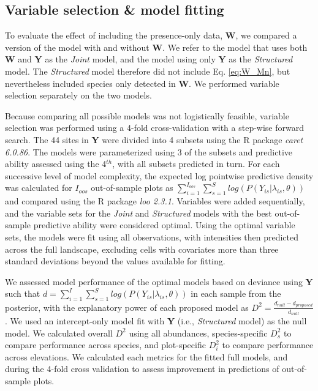 \documentclass[preprint,final,times,12pt,3p]{elsarticle}
\begin{document}
\subsection{Variable selection \& model fitting}
To evaluate the effect of including the presence-only data, \textbf{W}, we compared a version of the model with and without \textbf{W}. We refer to the model that uses both \textbf{W} and \textbf{Y} as the \emph{Joint} model, and the model using only \textbf{Y} as the \emph{Structured} model. The \emph{Structured} model therefore did not include Eq. \ref{eq:W_Mn}, but nevertheless included species only detected in \textbf{W}. We performed variable selection separately on the two models.

Because comparing all possible models was not logistically feasible, variable selection was performed using a 4-fold cross-validation with a step-wise forward search. The 44 sites in \textbf{Y} were divided into 4 subsets using the R package \emph{caret 6.0.86}. The models were parameterized using 3 of the subsets and predictive ability assessed using the 4$^{th}$, with all subsets predicted in turn. For each successive level of model complexity, the expected log pointwise predictive density was calculated for $I_{oos}$ out-of-sample plots as $\sum_{i=1}^{I_{oos}}\sum_{s=1}^S log(P(Y_{is} | \lambda_{is}, \theta))$ and compared using the R package \emph{loo 2.3.1}. Variables were added sequentially, and the variable sets for the \emph{Joint} and \emph{Structured} models with the best out-of-sample predictive ability were considered optimal. Using the optimal variable sets, the models were fit using all observations, with intensities then predicted across the full landscape, excluding cells with covariates more than three standard deviations beyond the values available for fitting.

We assessed model performance of the optimal models based on deviance using \textbf{Y} such that $d = \sum_{i=1}^{I}\sum_{s=1}^S log(P(Y_{is} | \lambda_{is}, \theta))$ in each sample from the posterior, with the explanatory power of each proposed model as $D^2 = \frac{d_{null} - d_{proposed}}{d_{null}}$ \citep{Caradima2019,Guisan2000}. We used an intercept-only model fit with \textbf{Y} (i.e., \emph{Structured} model) as the null model. We calculated overall $D^2$ using all abundances, species-specific $D^2_s$ to compare performance across species, and plot-specific $D^2_i$ to compare performance across elevations. We calculated each metrics for the fitted full models, and during the 4-fold cross validation to assess improvement in predictions of out-of-sample plots.
\end{document}
